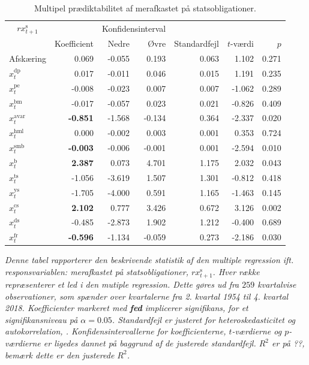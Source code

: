 \documentclass[
  a4paper,
  oneside]{memoir}
\begin{document}
\begin{table}[H]

\caption{\label{tab:MULT-s}Multipel prædiktabilitet af merafkastet på statsobligationer.}
\centering
\begin{threeparttable}
\begin{tabular}[t]{lrrrrrr}
\toprule
\multicolumn{1}{c}{$rx_{t+1}^{\text{s}}$} & \multicolumn{1}{c}{ } & \multicolumn{2}{c}{Konfidensinterval} & \multicolumn{3}{c}{ } \\
\cmidrule(l{3pt}r{3pt}){1-1} \cmidrule(l{3pt}r{3pt}){3-4}
  & Koefficient & Nedre & Øvre & Standardfejl & $t$-værdi & $p$\\
\midrule
\rowcolor{gray!6}  Afskæring & 0.069 & -0.055 & 0.193 & 0.063 & 1.102 & 0.271\\
$x_t^{\text{dp}}$ & 0.017 & -0.011 & 0.046 & 0.015 & 1.191 & 0.235\\
\rowcolor{gray!6}  $x_t^{\text{pe}}$ & -0.008 & -0.023 & 0.007 & 0.007 & -1.062 & 0.289\\
$x_t^{\text{bm}}$ & -0.017 & -0.057 & 0.023 & 0.021 & -0.826 & 0.409\\
\rowcolor{gray!6}  $x_t^{\text{avar}}$ & \textbf{-0.851} & -1.568 & -0.134 & 0.364 & -2.337 & 0.020\\
$x_t^{\text{hml}}$ & 0.000 & -0.002 & 0.003 & 0.001 & 0.353 & 0.724\\
\rowcolor{gray!6}  $x_t^{\text{smb}}$ & \textbf{-0.003} & -0.006 & -0.001 & 0.001 & -2.594 & 0.010\\
$x_t^{\text{b}}$ & \textbf{ 2.387} & 0.073 & 4.701 & 1.175 & 2.032 & 0.043\\
\rowcolor{gray!6}  $x_t^{\text{ts}}$ & -1.056 & -3.619 & 1.507 & 1.301 & -0.812 & 0.418\\
$x_t^{\text{ys}}$ & -1.705 & -4.000 & 0.591 & 1.165 & -1.463 & 0.145\\
\rowcolor{gray!6}  $x_t^{\text{cs}}$ & \textbf{ 2.102} & 0.777 & 3.426 & 0.672 & 3.126 & 0.002\\
$x_t^{\text{ds}}$ & -0.485 & -2.873 & 1.902 & 1.212 & -0.400 & 0.689\\
\rowcolor{gray!6}  $x_t^{\text{fr}}$ & \textbf{-0.596} & -1.134 & -0.059 & 0.273 & -2.186 & 0.030\\
\bottomrule
\end{tabular}
\begin{tablenotes}
\item \textit{Denne tabel rapporterer den beskrivende statistik af den multiple regression ift. responsvariablen: merafkastet på statsobligationer, $rx_{t+1}^{\text{s}}$. Hver række repræsenterer et led i den mutiple regression. Dette gøres ud fra $259$ kvartalvise observationer, som spænder over kvartalerne fra 2. kvartal 1954 til 4. kvartal 2018. Koefficienter markeret med \textbf{fed} implicerer signifikans, for et signifikansniveau på $\alpha=0.05$. Standardfejl er justeret for heteroskedasticitet og autokorrelation, \citep{Newey1987}. Konfidensintervallerne for koefficienterne, $t$-værdierne og $p$-værdierne er ligedes dannet på baggrund af de justerede standardfejl. $R^2$ er på ??, bemærk dette er den justerede $R^2$.}

\end{tablenotes}
\end{threeparttable}
\end{table}
\end{document}
